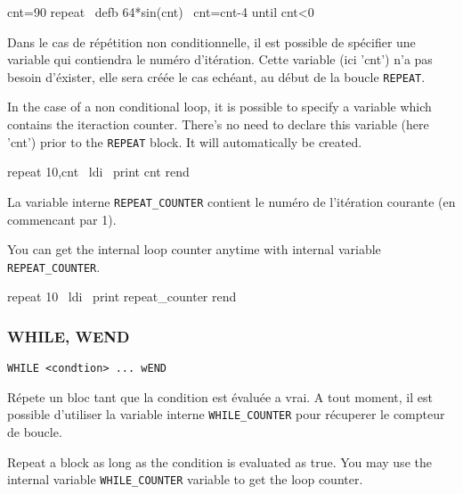 \begin{code}
cnt=90
repeat
\    defb 64*sin(cnt)
\    cnt=cnt-4
until cnt\textless 0
\end{code}

\begin{xfr}
Dans le cas de répétition non conditionnelle, il est possible de spécifier une variable qui contiendra le numéro d'itération.
Cette variable (ici 'cnt') n'a pas besoin d'éxister, elle sera créée le cas echéant, au début de la boucle \texttt{REPEAT}.
\end{xfr}

\begin{xen}
In the case of a non conditional loop, it is possible to specify a variable which contains the iteraction counter.
There's no need to declare this variable (here 'cnt') prior to the \texttt{REPEAT} block. It will automatically be created.
\end{xen}

\begin{code}
repeat 10,cnt
\ ldi
\ print cnt
rend
\end{code}

\begin{xfr}
La variable interne \texttt{REPEAT\_COUNTER} contient le numéro de l'itération courante (en commencant par 1).
\end{xfr}
\begin{xen}
You can get the internal loop counter anytime with internal variable \texttt{REPEAT\_COUNTER}.
\end{xen}

\begin{code}
repeat 10
\ ldi
\ print repeat\_counter
rend
\end{code}


\subsubsection{WHILE, WEND}
\begin{verbatim}
WHILE <condtion> ... wEND
\end{verbatim}

\begin{xfr}
Répete un bloc tant que la condition est évaluée a vrai. A tout moment, il est possible d'utiliser la variable interne \texttt{WHILE\_COUNTER} pour récuperer le compteur de boucle.
\end{xfr}

\begin{xen}
Repeat a block as long as the condition is evaluated as true. You may use the internal variable \texttt{WHILE\_COUNTER} variable to get the loop counter.
\end{xen}

